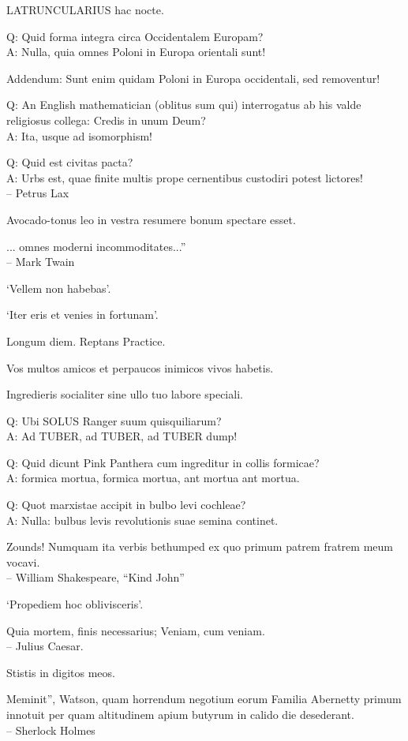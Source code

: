 \documentclass[titlepage,12pt]{memoir}
\begin{document}
LATRUNCULARIUS hac nocte.

Q: Quid forma integra circa Occidentalem Europam?\\
A: Nulla, quia omnes Poloni in Europa orientali sunt!

Addendum: Sunt enim quidam Poloni in Europa occidentali, sed
removentur!

Q: An English mathematician (oblitus sum qui) interrogatus ab his
valde religiosus collega: Credis in unum Deum?\\
A: Ita, usque ad isomorphism!

Q: Quid est civitas pacta?\\
A: Urbs est, quae finite multis prope cernentibus custodiri potest
lictores!
\\-- Petrus Lax

Avocado-tonus leo in vestra resumere bonum spectare esset.

... omnes moderni incommoditates...”
\\-- Mark Twain

‘Vellem non habebas’.

‘Iter eris et venies in fortunam’.

Longum diem. Reptans Practice.

Vos multos amicos et perpaucos inimicos vivos habetis.

 Ingredieris socialiter sine ullo tuo labore speciali.

Q: Ubi SOLUS Ranger suum quisquiliarum?\\
A: Ad TUBER, ad TUBER, ad TUBER dump!

Q: Quid dicunt Pink Panthera cum ingreditur in collis formicae?\\
A: formica mortua, formica mortua, ant mortua ant mortua.

Q: Quot marxistae accipit in bulbo levi cochleae?\\
A: Nulla: bulbus levis revolutionis suae semina continet.

Zounds! Numquam ita verbis bethumped
ex quo primum patrem fratrem meum vocavi.
\\-- William Shakespeare, “Kind John”

‘Propediem hoc oblivisceris’.

Quia mortem, finis necessarius;
Veniam, cum veniam.
\\-- Julius Caesar.

Stistis in digitos meos.

Meminit”, Watson, quam horrendum negotium eorum
Familia Abernetty primum innotuit per quam altitudinem
apium butyrum in calido die desederant.
\\-- Sherlock Holmes
\end{document}
